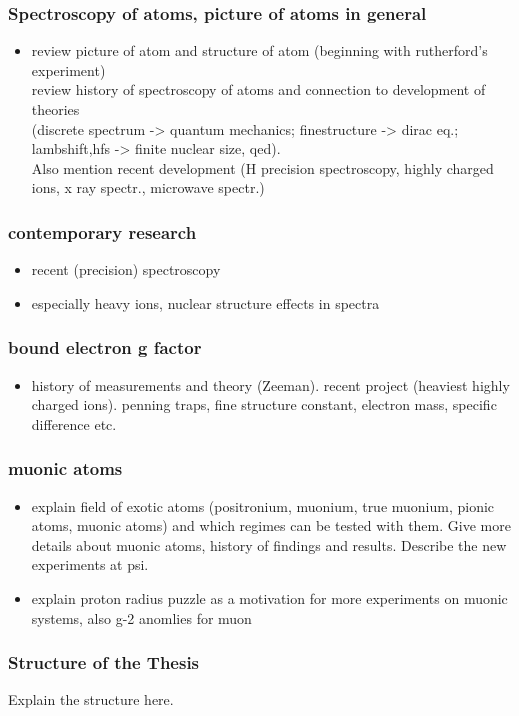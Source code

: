 \subsubsection*{Spectroscopy of atoms, picture of atoms in general}
\begin{itemize}
\item
review picture of atom and structure of atom (beginning with rutherford's experiment)\\
review history of spectroscopy of atoms and connection to development of theories\\
(discrete spectrum -> quantum mechanics; finestructure -> dirac eq.; lambshift,hfs -> finite nuclear size, qed). \\
Also mention recent development (H precision spectroscopy, highly charged ions, x ray spectr., microwave spectr.)\\
\end{itemize}

\subsubsection*{contemporary research}
\begin{itemize}
\item recent (precision) spectroscopy
\item especially heavy ions, nuclear structure effects in spectra
\end{itemize}

\subsubsection*{bound electron g factor}
\begin{itemize}
\item
history of measurements and theory (Zeeman). recent project (heaviest highly charged ions). penning traps, fine structure constant, electron mass, specific difference etc.
\end{itemize}

\subsubsection*{muonic atoms}
\begin{itemize}
\item
explain field of exotic atoms (positronium, muonium, true muonium, pionic atoms, muonic atoms) and which regimes can be tested with them. Give more details about muonic atoms, history of findings and results. Describe the new experiments at psi.
\item 
explain proton radius puzzle as a motivation for more experiments on muonic systems, also g-2 anomlies for muon
\end{itemize}



\subsubsection*{Structure of the Thesis}

Explain the structure here.




